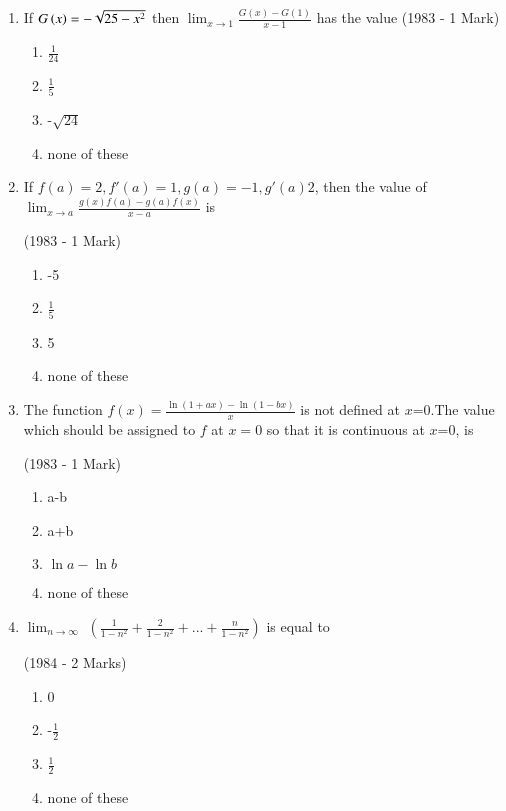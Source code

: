 \documentclass[journal,12pt,twocolumn]{IEEEtran}
\theoremstyle{remark}
\begin{document}
\begin{enumerate}[start=2]
\begin{enumerate}
           
    \end{enumerate}

\item If $G\left(x\right)=-\sqrt{25-x^2}$ then $\lim_{x \to 1}\frac{G(x)-G(1)}{x-1}$ has the value
\hfill    (1983 - 1 Mark)
\begin{enumerate}
    \item $\frac{1}{24}$
    \item $\frac{1}{5}$
    \item -$\sqrt{24}$
    \item none of these
    
\end{enumerate}

\item If $f(a)=2,f'(a)=1,g(a)=-1,g'(a)2$, then the value of $\lim_{x\to a}\frac{g(x)f(a)-g(a)f(x)}{x-a}$ is

  \hfill (1983 - 1 Mark)
     \begin{enumerate}
         \item -5
         \item $\frac{1}{5}$
         \item 5
         \item none of these
     \end{enumerate}

\item The function $f(x)=\frac{\ln{(1+ax)}-\ln{(1-bx)}}{x}$ is not defined at $x$=0.The value which should be assigned to $f$ at $x=0$ so that it is continuous at $x$=0, is

  \hfill              (1983 - 1 Mark)
    \begin{enumerate}
        \item a-b
        \item a+b
        \item $\ln{a}-\ln{b}$
        \item none of these
        
    \end{enumerate}

\item $\lim_{n\to \infty}$
      $\left(
      \frac{1}{1-n^2} + \frac{2}{1-n^2} +...+ \frac{n}{1-n^2}
       \right)$ is equal to
       
             \hfill(1984 - 2 Marks)
                 \begin{enumerate}
                    \item 0
                    \item -$\frac{1}{2}$
                    \item $\frac{1}{2}$
                    \item none of these
             

\end{enumerate}
\end{enumerate}
\end{document}

